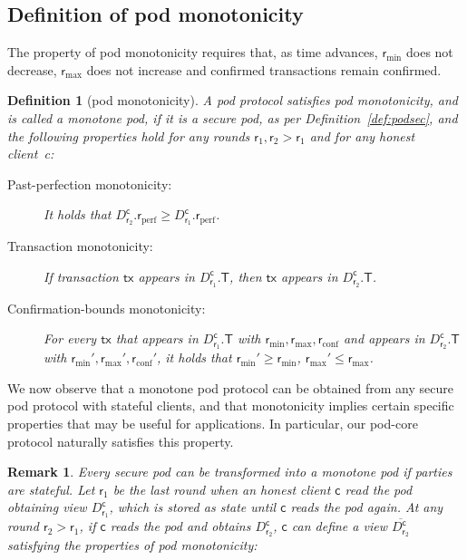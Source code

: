 \documentclass[pdflatex,sn-mathphys-num]{sn-jnl}%
\theoremstyle{thmstyleone}%
\theoremstyle{thmstyletwo}%
\newtheorem{remark}{Remark}%
\theoremstyle{thmstylethree}%
\newtheorem{definition}{Definition}%
\newcommand{\podtm}{\textsf{pod}\xspace}
\newcommand{\operand}[1]{\textsf{#1}}
\newcommand{\tx}{\operand{tx}\xspace}
\newcommand{\round}{\operand{r}\xspace}
\newcommand{\client}{\operand{c}\xspace}
\newcommand{\rconf}{\ensuremath{\round_\text{conf}}\xspace}
\newcommand{\rmin}{\ensuremath{\round_\text{min}}\xspace}
\newcommand{\rmax}{\ensuremath{\round_\text{max}}\xspace}
\newcommand{\rperf}{\ensuremath{\round_\text{perf}}\xspace}
\newcommand{\txSet}{\operand{T}\xspace}
\newcommand{\Pod}{\ensuremath{D}\xspace}
\newcommand{\podView}[2]{\ensuremath{\Pod_{#2}^{#1}}\xspace}
\begin{document}

\begin{appendices}

\section{Definition of \podtm monotonicity}\label{app:monotonicity}
The property of \podtm monotonicity requires that, as time advances, $\rmin$ does not decrease, $\rmax$ does not increase and confirmed transactions remain confirmed.

\begin{definition}[\podtm monotonicity]
    A \podtm protocol satisfies \emph{pod monotonicity}, and is called a \emph{monotone \podtm}, if it is a secure \podtm, as per Definition~\ref{def:podsec}, and the following properties hold for any rounds $\round_1,\round_2 > \round_1$ and for any honest client~\client:
    \begin{description}
        \item [Past-perfection monotonicity:] It holds that $\podView{\client}{\round_2}.\rperf \geq \podView{\client}{\round_1}.\rperf$.
        \item [Transaction monotonicity:] If  transaction $\tx$ appears in $\podView{\client}{\round_1}.\txSet$, then $\tx$ appears in $\podView{\client}{\round_2}.\txSet$.
        \item [Confirmation-bounds monotonicity:] For every $\tx$ that appears in $\podView{\client}{\round_1}.\txSet$ with $\rmin,\rmax,\rconf$ and appears in  $\podView{\client}{\round_2}.\txSet$ with $\rmin',\rmax',\rconf'$,  it holds that $\rmin'\geq \rmin$, $\rmax' \leq \rmax$.

    \end{description}
\end{definition}

We now observe that a monotone \podtm protocol can be obtained from any secure \podtm protocol with stateful clients, and that monotonicity implies certain specific properties that may be useful for applications. In particular, our \podtm-core protocol naturally satisfies this property.

\begin{remark}
    Every secure \podtm can be transformed into a monotone \podtm if parties are stateful. Let $\round_1$ be the last round when an honest client $\client$ read the \podtm obtaining view $\podView{\client}{\round_1}$, which is stored as state until $\client$ reads the \podtm again. At any round $\round_2>\round_1$, if $\client$ reads the \podtm and obtains $\podView{\client}{\round_2}$, $\client$ can define a view $\overline{\podView{\client}{\round_2}}$ satisfying the properties of \podtm monotonicity:


\end{remark}
\end{appendices}
\end{document}
